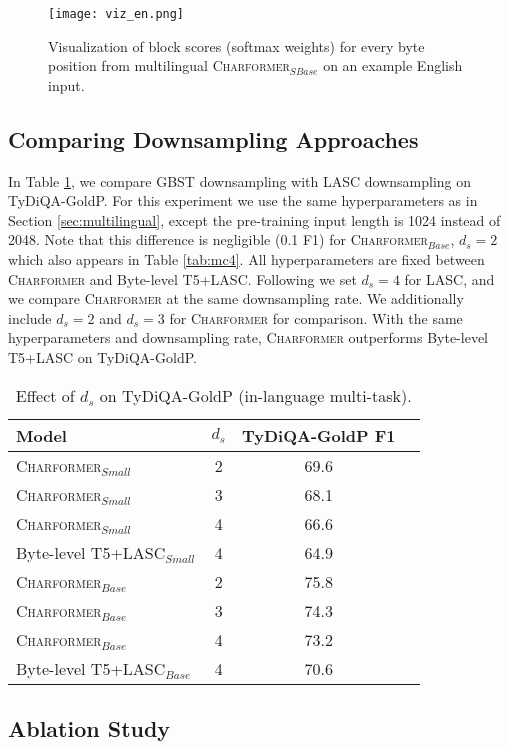 \documentclass{article} \usepackage{iclr2022_conference,times}
\newcommand{\charformer}{\textsc{Charformer}\xspace}
\newcommand{\charformersmall}{\textsc{Charformer}$_{Small}$\xspace}
\newcommand{\charformerbase}{\textsc{Charformer}$_{Base}$\xspace}
\newcommand{\charformertall}{\textsc{Charformer}$_{SBase}$\xspace}
\newcommand{\canine}{Byte-level T5+LASC\xspace}
\newcommand{\caninesmall}{Byte-level T5+LASC$_{Small}$\xspace}
\newcommand{\caninebase}{Byte-level T5+LASC$_{Base}$\xspace}
\begin{document}
\begin{figure}[t] \centering
\texttt{[image: viz\_en.png]}
\caption{Visualization of block scores (softmax weights) for every byte position from multilingual \mbox{\charformertall} on an example English input.}
\label{fig:viz}
\end{figure}

\subsection{Comparing Downsampling Approaches} \label{sec:downsampling}
In Table \ref{tab:tydids}, we compare GBST downsampling with LASC downsampling \citep{clark2021canine} on TyDiQA-GoldP. For this experiment we use the same hyperparameters as in Section \ref{sec:multilingual}, except the pre-training input length is 1024 instead of 2048. Note that this difference is negligible (0.1 F1) for \charformerbase, $d_s=2$ which also appears in Table \ref{tab:mc4}. All hyperparameters are fixed between \charformer and \canine. Following \citep{clark2021canine} we set $d_s = 4$ for LASC, and we compare \charformer at the same downsampling rate. We additionally include $d_s = 2$ and $d_s = 3$ for \charformer for comparison. With the same hyperparameters and downsampling rate, \charformer outperforms \canine on TyDiQA-GoldP.

\begin{table}[t]
\small
    \centering
    \caption{Effect of $d_s$ on TyDiQA-GoldP (in-language multi-task).}
    \begin{tabular}{l c c c}
    \toprule
     Model & $d_s$ & TyDiQA-GoldP F1 \\
     \midrule
     \charformersmall & 2 & 69.6 \\
     \charformersmall & 3 & 68.1 \\
     \charformersmall & 4 & 66.6 \\
     \caninesmall & 4 & 64.9 \\
     \midrule
     \charformerbase & 2 & 75.8 \\
     \charformerbase & 3 & 74.3 \\
     \charformerbase & 4 & 73.2 \\
     \caninebase & 4 & 70.6 \\
     \bottomrule
    \end{tabular}
    \label{tab:tydids}
\end{table}


\subsection{Ablation Study}
\end{document}
